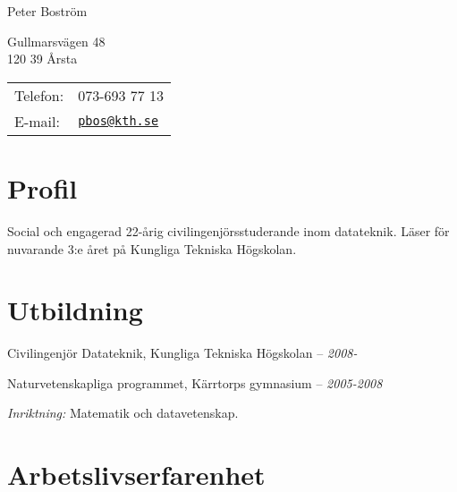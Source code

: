 \documentclass[a4paper]{article}
\def\name{Peter Boström}
\renewenvironment{itemize}{
  \begin{list}{}{
    \setlength{\leftmargin}{1.5em}
  }
}{
  \end{list}
}
\begin{document}
{\huge \name}


\vspace{8mm}

\begin{minipage}{0.45\linewidth}
  Gullmarsvägen 48 \\
  120 39 Årsta \\
\end{minipage}
\begin{minipage}{0.45\linewidth}
  \begin{tabular}{ll}
    Telefon: & 073-693 77 13 \\
    E-mail: & \href{mailto:pbos@kth.se}{\tt pbos@kth.se} \\
  \end{tabular}
\end{minipage}

\section*{Profil}

\begin{itemize}
	\item Social och engagerad 22-årig civilingenjörsstuderande inom datateknik. Läser för nuvarande 3:e året på Kungliga Tekniska Högskolan.
\end{itemize}

\section*{Utbildning}

\begin{itemize}
  \item Civilingenjör Datateknik, Kungliga Tekniska Högskolan -- \emph{2008-}

  \item Naturvetenskapliga programmet, Kärrtorps gymnasium -- \emph{2005-2008}
  \begin{itemize}
  	\item \emph{Inriktning:} Matematik och datavetenskap.
  \end{itemize}
\end{itemize}


\section*{Arbetslivserfarenhet}
\end{document}
